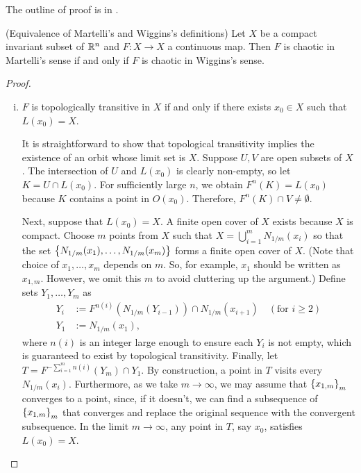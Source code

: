 \documentclass[12pt,draft,twoside]{book}
\begin{document}
The outline of proof is in \citet{martelli}.
\begin{theorem}
  (Equivalence of Martelli's and Wiggins's definitions)
  Let $X$ be a compact invariant subset of $\mathbb{R}^n$ and $F: X\to X$ a continuous map.
  Then $F$ is chaotic in Martelli's sense if and only if $F$ is chaotic in Wiggins's sense.
  \label{thm:martelliwigginsequiv}

\begin{proof}
   \begin{enumerate}[(i)]
    \item $F$ is topologically transitive in $X$ if and only if there exists $x_0 \in X$ such that $L(x_0) = X$.

    It is straightforward to show that topological transitivity implies the existence of an orbit whose limit set is $X$.
    Suppose $U,V$ are open subsets of $X$.
    The intersection of $U$ and $L(x_0)$ is clearly non-empty, so let $K = U \cap L(x_0)$.
    For sufficiently large $n$, we obtain $F^n(K) = L(x_0)$ because $K$ contains a point in $O(x_0)$.
    Therefore, $F^n(K) \cap V \neq \emptyset$.

    Next, suppose that $L(x_0) = X$.
    A finite open cover of $X$ exists because $X$ is compact.
    Choose $m$ points from $X$ such that $X = \bigcup\limits_{i=1}^m N_{1/m}(x_i)$
    so that the set $\left \{ N_{1/m}(x_1), \ldots, N_{1/m}(x_m) \right \}$ forms a finite open cover of $X$.
    (Note that choice of $x_1, \ldots, x_m$ depends on $m$.
    So, for example, $x_1$ should be written as $x_{1,m}$.
    However, we omit this $m$ to avoid cluttering up the argument.)
    Define sets $Y_1, \ldots, Y_m$ as
    \begin{align*}
      Y_i &:= F^{n(i)}(N_{1/m}(Y_{i-1})) \cap N_{1/m}(x_{i+1}) \quad (\mbox{for } i \geq 2) \\
      Y_1 &:= N_{1/m}(x_1),
    \end{align*}
    where $n(i)$ is an integer large enough to ensure each $Y_i$ is not empty, which is guaranteed to exist by topological transitivity.
    Finally, let $T = F^{-\sum\limits_{i=1}^{m}n(i)}(Y_m) \cap Y_1$.
    By construction, a point in $T$ visits every $N_{1/m}(x_i)$.
    Furthermore, as we take $m \to \infty$, we may assume that $\left \{ x_{1,m} \right \}_m$ converges to a point, 
    since, if it doesn't, we can find a subsequence of $\left \{ x_{1,m} \right \}_m$ that converges and replace the original sequence with the convergent subsequence.
    In the limit $m \to \infty$, any point in $T$, say $x_0$, satisfies $L(x_0) = X$.


\end{enumerate}
\end{proof}
\end{theorem}
\end{document}
